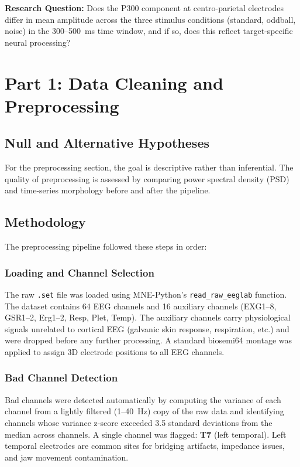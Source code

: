 \documentclass[11pt, a4paper, twocolumn]{article}
\begin{document}
\textbf{Research Question:} Does the P300 component at centro-parietal
electrodes differ in mean amplitude across the three stimulus conditions
(standard, oddball, noise) in the 300--500~ms time window, and if so,
does this reflect target-specific neural processing?

\section{Part 1: Data Cleaning and Preprocessing}

\subsection{Null and Alternative Hypotheses}

For the preprocessing section, the goal is descriptive rather than
inferential. The quality of preprocessing is assessed by comparing
power spectral density (PSD) and time-series morphology before and
after the pipeline.

\subsection{Methodology}

The preprocessing pipeline followed these steps in order:

\subsubsection{Loading and Channel Selection}

The raw \texttt{.set} file was loaded using MNE-Python's
\texttt{read\_raw\_eeglab} function. The dataset contains 64 EEG channels
and 16 auxiliary channels (EXG1--8, GSR1--2, Erg1--2, Resp, Plet, Temp).
The auxiliary channels carry physiological signals unrelated to cortical
EEG (galvanic skin response, respiration, etc.) and were dropped before
any further processing. A standard biosemi64 montage was applied to assign
3D electrode positions to all EEG channels.

\subsubsection{Bad Channel Detection}

Bad channels were detected automatically by computing the variance of each
channel from a lightly filtered (1--40~Hz) copy of the raw data and
identifying channels whose variance z-score exceeded 3.5 standard
deviations from the median across channels. A single channel was flagged:
\textbf{T7} (left temporal). Left temporal electrodes are common sites for
bridging artifacts, impedance issues, and jaw movement contamination.
\end{document}
